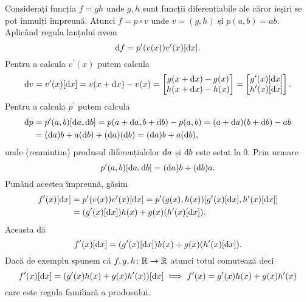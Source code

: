 \documentclass[../../book-main_ro.tex]{subfiles}
\begin{document}
\begin{example}
    Considerați funcția \(f = gh\) unde \(g, h\) sunt funcții diferențiabile ale căror ieșiri se pot înmulți împreună. Atunci \(f = p \circ v\) unde \(v = (g, h)\) și \(p(a, b) = ab\). Aplicând regula lanțului avem
    \begin{equation}
        \mathrm{d}f = p^{\prime}(v(x))v^{\prime}(x)[\mathrm{d}x].
    \end{equation}
    Pentru a calcula \(v^{\prime}(x)\) putem calcula
    \begin{equation}
        \mathrm{d}v = v^{\prime}(x)[\mathrm{d}x] = v(x + \mathrm{d}x) - v(x) = \begin{bmatrix}g(x + \mathrm{d}x) - g(x) \\ h(x + \mathrm{d}x) - h(x)\end{bmatrix} = \begin{bmatrix}g^{\prime}(x)[\mathrm{d}x] \\ h^{\prime}(x)[\mathrm{d}x]\end{bmatrix}.
    \end{equation}
    Pentru a calcula \(p^{\prime}\) putem calcula
    \begin{align}
        \mathrm{d}p 
        &= p^{\prime}(a, b)[\mathrm{d}a, \mathrm{d}b] = p(a + \mathrm{d}a, b + \mathrm{d}b) - p(a, b) = (a + \mathrm{d}a)(b + \mathrm{d}b) - ab \\
        &= (\mathrm{d}a)b + a(\mathrm{d}b) + (\mathrm{d}a)(\mathrm{d}b) = (\mathrm{d}a)b + a(\mathrm{d}b),
    \end{align}
    unde (reamintim) produsul diferențialelor \(\mathrm{d}a\) și \(\mathrm{d}b\) este setat la \(0\). Prin urmare
    \begin{equation}
        p^{\prime}(a, b)[\mathrm{d}a, \mathrm{d}b] = (\mathrm{d}a)b + (\mathrm{d}b)a.
    \end{equation}
    Punând acestea împreună, găsim
    \begin{align}
        f^{\prime}(x)[\mathrm{d}x] 
        &= p^{\prime}(v(x))v^{\prime}(x)[\mathrm{d}x] = p^{\prime}(g(x), h(x))[g^{\prime}(x)[\mathrm{d}x], h^{\prime}(x)[\mathrm{d}x]] \\
        &= (g^{\prime}(x)[\mathrm{d}x])h(x) + g(x)(h^{\prime}(x)[\mathrm{d}x]).
    \end{align}
    Aceasta dă
    \begin{equation}
        f^{\prime}(x)[\mathrm{d}x] = (g^{\prime}(x)[\mathrm{d}x])h(x) + g(x)(h^{\prime}(x)[\mathrm{d}x]).
    \end{equation}
    Dacă de exemplu spunem că \(f, g, h \colon \mathbb{R} \to \mathbb{R}\) atunci totul comutează deci
    \begin{equation}
        f^{\prime}(x)[\mathrm{d}x] = (g^{\prime}(x)h(x) + g(x)h^{\prime}(x))[\mathrm{d}x] \implies f^{\prime}(x) = g^{\prime}(x)h(x) + g(x)h^{\prime}(x)
    \end{equation}
    care este regula familiară a produsului.
\end{example}
\end{document}
